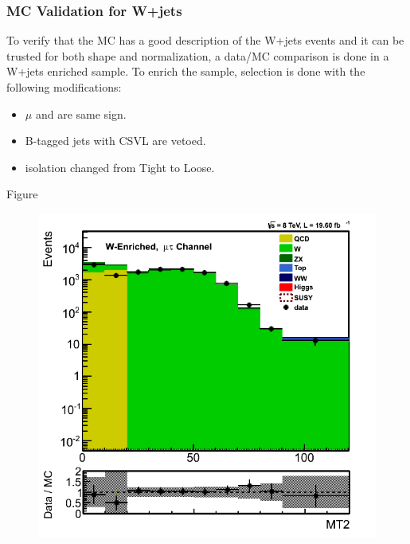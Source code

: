 \subsubsection{MC Validation for W+jets}
To verify that the MC has a good description of the W+jets events and it can be trusted for both shape and normalization, a data/MC comparison 
is done in a W+jets enriched sample. To enrich the sample, \muTau selection is done with the following modifications:
\begin{itemize}
\item $\mu$ and \Tau are same sign.
\item B-tagged jets with CSVL are vetoed.
\item \Tau isolation changed from Tight to Loose.
\end{itemize}
Figure 
\begin{figure}[htbp]
\centering
\includegraphics[angle=0,scale=0.35]{TauTauFigs/MT2_WValidation.png}
\caption{}
\label{fig:mt2_WValidation}
\end{figure}

